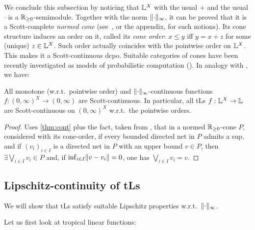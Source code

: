 We conclude this subsection by noticing that $\mathbb{L}^X$ with the usual $+$ and the usual $\cdot$ is a $\mathbb{R}_{\geq0}$-semimodule.
Together with the norm $\lVert\cdot\rVert_\infty$, it can be proved that it is a Scott-complete \emph{normed cone} (see~\cite{Selinger2004}, or the appendix, for such notions).
Its cone structure induces an order on it, called its \emph{cone order}:
$x\leq y$ iff $y=x+z$ for some (unique) $z\in\mathbb{L}^X$.
Such order actually coincides with the pointwise order on $\mathbb{L}^X$.
This makes it a Scott-continuous dcpo.
Suitable categories of cones have been recently investigated as models of probabilistic computation (\cite{Crubillie2018, EhrPagTas2018, Ehrhard2020}).
In analogy with \cite[Proposition 17]{DanEhrh2011}, we have:

\begin{theorem}\label{thm:ScottCont}
 All monotone (w.r.t.\ pointwise order) and $\lVert\cdot\rVert_{\infty}$-continuous functions $f:(0,\infty)^X\to (0,\infty)$ are Scott-continuous.
 In particular, all tLs $f:\mathbb{L}^X\to\mathbb{L}$ are Scott-continuous on $(0,\infty)^X$ w.r.t.\ the pointwise orders.
\end{theorem}
\begin{proof}
 Uses \autoref{thm:cont} plus the fact, taken from \cite{Selinger2004}, that in a normed $\mathbb{R}_{\geq 0}$-cone $P$, considered with its cone-order, if every bounded directed net in $P$ admits a sup, and if $(v_i)_{i\in I}$ is a directed net in $P$ with an upper bound $v\in P$, then $\exists\bigvee_{i\in I} v_i \in P$ and, if $\inf_{i\in I} \lVert v-v_i\rVert =0$, one has $\bigvee_{i\in I} v_i = v$.
\end{proof}



\subsection{Lipschitz-continuity of tLs}\label{sec:4C}%


We will show that tLs satisfy suitable Lipschitz properties w.r.t.\ $\lVert\cdot\rVert_\infty$. 

Let us first look at tropical linear functions:


